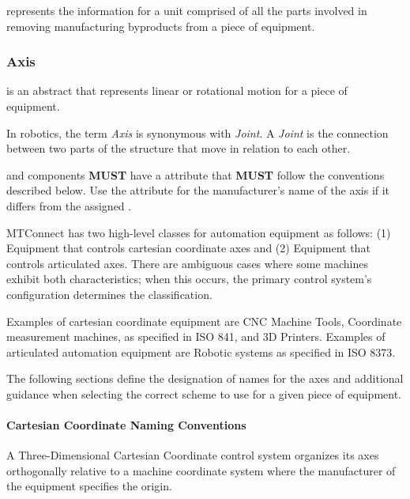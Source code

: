  represents the information for a unit comprised of all the parts involved in removing manufacturing byproducts from a piece of equipment.




\subsubsection{Axis}
\label{sec:Axis}



 is an abstract  that represents linear or rotational motion for a piece of equipment.

In robotics, the term \textit{Axis} is synonymous with \textit{Joint}. A \textit{Joint} is the connection between two parts of the structure that move in relation to each other.

 and  components \textbf{MUST} have a  attribute that \textbf{MUST} follow the conventions described below. Use the  attribute for the manufacturer's name of the axis if it differs from the assigned .

MTConnect has two high-level classes for automation equipment as follows: (1) Equipment that controls cartesian coordinate axes and (2) Equipment that controls articulated axes. There are ambiguous cases where some machines exhibit both characteristics; when this occurs, the primary control system's configuration determines the classification.

Examples of cartesian coordinate equipment are CNC Machine Tools, Coordinate measurement machines, as specified in ISO 841, and 3D Printers. Examples of articulated automation equipment are Robotic systems as specified in ISO 8373.

The following sections define the designation of names for the axes and additional guidance when selecting the correct scheme to use for a given piece of equipment.

\paragraph{Cartesian Coordinate Naming Conventions}
\label{sec:Cartesian Coordinate Naming Conventions}

A Three-Dimensional Cartesian Coordinate control system organizes its axes orthogonally relative to a machine coordinate system where the manufacturer of the equipment specifies the origin. 

